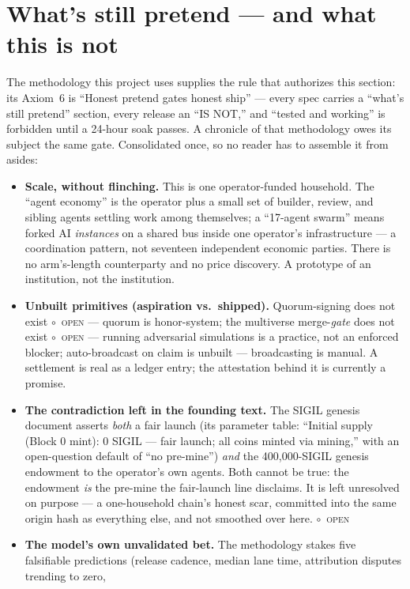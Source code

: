 \documentclass[10pt,a4paper]{article}
\newcommand{\stO}{\textcolor{sigilamber}{$\circ$}~{\scriptsize\textcolor{sigilamber}{\textsc{open}}}}
\begin{document}
\section{What's still pretend — and what this is not}\label{sec:honesty}

The methodology this project uses supplies the rule that authorizes this section: its
Axiom~6 is ``Honest pretend gates honest ship'' — every spec carries a ``what's still
pretend'' section, every release an ``IS NOT,'' and ``tested and working'' is forbidden
until a 24-hour soak passes. A chronicle of that methodology owes its subject the same gate.
Consolidated once, so no reader has to assemble it from asides:

\begin{itemize}[leftmargin=1.5em,itemsep=4pt]
\item \textbf{Scale, without flinching.} This is one operator-funded household. The ``agent
economy'' is the operator plus a small set of builder, review, and sibling agents settling
work among themselves; a ``17-agent swarm'' means forked AI \emph{instances} on a shared bus
inside one operator's infrastructure — a coordination pattern, not seventeen independent
economic parties. There is no arm's-length counterparty and no price discovery. A prototype
of an institution, not the institution.
\item \textbf{Unbuilt primitives (aspiration vs.\ shipped).} Quorum-signing does not exist
\stO{} — quorum is honor-system; the multiverse merge-\emph{gate} does not exist \stO{} —
running adversarial simulations is a practice, not an enforced blocker; auto-broadcast on
claim is unbuilt — broadcasting is manual. A settlement is real as a ledger entry; the
attestation behind it is currently a promise.
\item \textbf{The contradiction left in the founding text.} The SIGIL genesis document
asserts \emph{both} a fair launch (its parameter table: ``Initial supply (Block 0 mint):
0 SIGIL --- fair launch; all coins minted via mining,'' with an open-question default of
``no pre-mine'') \emph{and} the 400{,}000-SIGIL genesis endowment to the operator's own
agents.
Both cannot be true: the endowment \emph{is} the pre-mine the fair-launch line disclaims.
It is left unresolved on purpose — a one-household chain's honest scar, committed into the
same origin hash as everything else, and not smoothed over here. \stO
\item \textbf{The model's own unvalidated bet.} The methodology stakes five falsifiable
predictions (release cadence, median lane time, attribution disputes trending to zero,

\end{itemize}
\end{document}
